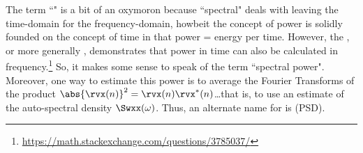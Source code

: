 \begin{remark}
The term ``" is a bit of an oxymoron because ``spectral"
deals with leaving the time-domain for the frequency-domain, howbeit
the concept of power is solidly founded on the concept of time in that power = energy per time.
However, the , or more generally  ,
demonstrates that power in time can also be calculated in frequency.\footnote{\url{https://math.stackexchange.com/questions/3785037/}}
So, it makes some sense to speak of the term ``spectral power".
Moreover, one way to estimate this power is to average the
Fourier Transforms of the product $\abs{\rvx(n)}^2=\rvx(n)\rvx^\ast(n)$\ldots that is, to use an estimate of
the auto-spectral density $\Swxx(\omega)$.
Thus, an alternate name for  is  (PSD).
\end{remark}